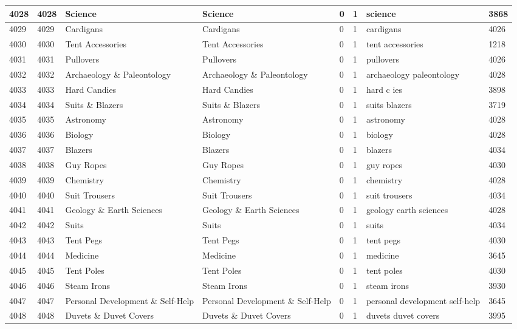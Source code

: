 \begin{longtable}{|l|l|l|l|l|l|l|l|}
4028 & 4028 & Science & Science & 0 & 1 & science & 3868 \\ \hline 
4029 & 4029 & Cardigans & Cardigans & 0 & 1 & cardigans & 4026 \\ \hline 
4030 & 4030 & Tent Accessories & Tent Accessories & 0 & 1 & tent accessories & 1218 \\ \hline 
4031 & 4031 & Pullovers & Pullovers & 0 & 1 & pullovers & 4026 \\ \hline 
4032 & 4032 & Archaeology \& Paleontology & Archaeology \& Paleontology & 0 & 1 & archaeology paleontology & 4028 \\ \hline 
4033 & 4033 & Hard Candies & Hard Candies & 0 & 1 & hard c ies & 3898 \\ \hline 
4034 & 4034 & Suits \& Blazers & Suits \& Blazers & 0 & 1 & suits blazers & 3719 \\ \hline 
4035 & 4035 & Astronomy & Astronomy & 0 & 1 & astronomy & 4028 \\ \hline 
4036 & 4036 & Biology & Biology & 0 & 1 & biology & 4028 \\ \hline 
4037 & 4037 & Blazers & Blazers & 0 & 1 & blazers & 4034 \\ \hline 
4038 & 4038 & Guy Ropes & Guy Ropes & 0 & 1 & guy ropes & 4030 \\ \hline 
4039 & 4039 & Chemistry & Chemistry & 0 & 1 & chemistry & 4028 \\ \hline 
4040 & 4040 & Suit Trousers & Suit Trousers & 0 & 1 & suit trousers & 4034 \\ \hline 
4041 & 4041 & Geology \& Earth Sciences & Geology \& Earth Sciences & 0 & 1 & geology earth sciences & 4028 \\ \hline 
4042 & 4042 & Suits & Suits & 0 & 1 & suits & 4034 \\ \hline 
4043 & 4043 & Tent Pegs & Tent Pegs & 0 & 1 & tent pegs & 4030 \\ \hline 
4044 & 4044 & Medicine & Medicine & 0 & 1 & medicine & 3645 \\ \hline 
4045 & 4045 & Tent Poles & Tent Poles & 0 & 1 & tent poles & 4030 \\ \hline 
4046 & 4046 & Steam Irons & Steam Irons & 0 & 1 & steam irons & 3930 \\ \hline 
4047 & 4047 & Personal Development \& Self-Help & Personal Development \& Self-Help & 0 & 1 & personal development self-help & 3645 \\ \hline 
4048 & 4048 & Duvets \& Duvet Covers & Duvets \& Duvet Covers & 0 & 1 & duvets duvet covers & 3995 \\ \hline 

\end{longtable}
